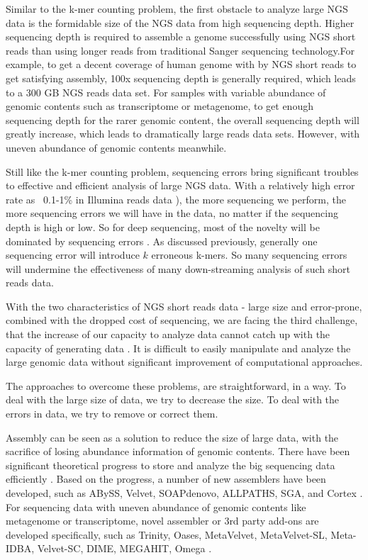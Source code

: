 Similar to the k-mer counting problem, the first obstacle to analyze large NGS data
is the formidable size of 
the NGS data from high sequencing depth. Higher sequencing depth is 
required to assemble a genome successfully using NGS short reads than using 
longer reads from traditional Sanger sequencing technology.For example, to get
a decent coverage of human genome with by NGS short reads to get satisfying assembly, 
100x sequencing depth is generally required, which leads to a 300 GB NGS reads 
data set\cite{pubmed21187386}. For samples with variable abundance of genomic 
contents such as transcriptome or metagenome, to get enough sequencing depth for
the rarer genomic content, the overall sequencing depth will greatly increase, 
which leads to dramatically large reads data sets. However, with uneven
abundance of genomic contents meanwhile. 

Still like the k-mer counting problem, sequencing errors bring significant troubles
to effective and efficient analysis of large NGS data. With a relatively high 
error rate as ~0.1-1\% in Illumina reads data \cite{pubmed19997069}), the more 
sequencing we perform, the more sequencing errors we will have in the data, no 
matter if the sequencing depth is high or low. So for deep sequencing, most
of the novelty will be dominated by sequencing errors \cite{pubmed21245053}.
As discussed previously, generally one sequencing error will
introduce $k$ erroneous k-mers. So many sequencing errors will undermine the 
effectiveness of many down-streaming analysis of such short reads data.

With the two characteristics of NGS short reads data - large size and error-prone,
 combined with the dropped cost of sequencing, 
we are facing the third challenge, that the increase of our capacity to analyze data cannot
catch up with the capacity of generating data \cite{pubmed20441614}.  It is difficult
to easily manipulate and analyze the large genomic data without significant improvement
of computational approaches.

The approaches to overcome these problems, are straightforward, in a way. To deal
with the large size of data, we try to decrease the size. To deal with the 
errors in data, we try to remove or correct them. 

Assembly can be seen as a solution to reduce the size of large data, with the 
sacrifice of losing abundance information of genomic contents. There have
been significant theoretical progress to store and analyze the big sequencing data
efficiently
\cite{pubmed22068540,pubmed20529929}. Based on the progress, a number of new 
assemblers have been developed,
such as ABySS, Velvet, SOAPdenovo, ALLPATHS, SGA, and Cortex
\cite{pubmed19251739,pubmed18349386,pubmed20511140,pubmed21187386,
pubmed22156294,Iqbal2012}. For sequencing data with uneven abundance of genomic contents
like metagenome or transcriptome, novel assembler or 3rd party add-ons are developed
specifically, such as Trinity, Oases, MetaVelvet, MetaVelvet-SL, Meta-IDBA, Velvet-SC, DIME, MEGAHIT, Omega
\cite{pubmed21572440,pubmed22368243,Namiki2012,Afiahayati2015, pubmed21685107,pubmed21926975,Guo2015,Li2015,Haider2014}.

